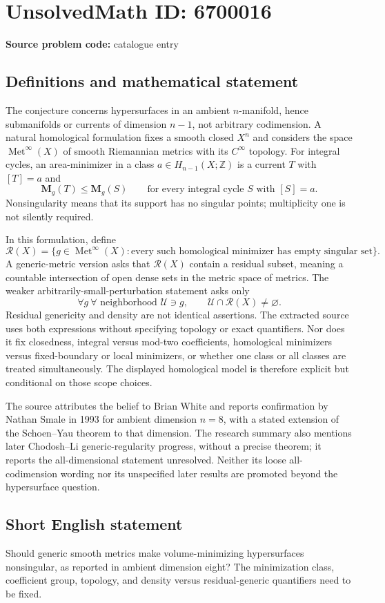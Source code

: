 \documentclass[11pt]{article}
\newcommand{\Z}{\mathbb{Z}}
\begin{document}
\section*{UnsolvedMath ID: 6700016}
\textbf{Source problem code:} catalogue entry
\subsection{Definitions and mathematical statement}
The conjecture concerns hypersurfaces in an ambient \(n\)-manifold, hence submanifolds or currents of dimension \(n-1\), not arbitrary codimension. A natural homological formulation fixes a smooth closed \(X^n\) and considers the space \(\operatorname{Met}^\infty(X)\) of smooth Riemannian metrics with its \(C^\infty\) topology. For integral cycles, an area-minimizer in a class \(a\in H_{n-1}(X;\Z)\) is a current \(T\) with \([T]=a\) and
\[
\mathbf M_g(T)\le\mathbf M_g(S)\qquad\text{for every integral cycle }S\text{ with }[S]=a.
\]
Nonsingularity means that its support has no singular points; multiplicity one is not silently required.

In this formulation, define
\[
\mathcal R(X)=\{g\in\operatorname{Met}^\infty(X):
 \text{every such homological minimizer has empty singular set}\}.
\]
A generic-metric version asks that \(\mathcal R(X)\) contain a residual subset, meaning a countable intersection of open dense sets in the metric space of metrics. The weaker arbitrarily-small-perturbation statement asks only
\[
\forall g\ \forall\text{ neighborhood }\mathcal U\ni g,
\qquad \mathcal U\cap\mathcal R(X)\ne\varnothing.
\]
Residual genericity and density are not identical assertions. The extracted source uses both expressions without specifying topology or exact quantifiers. Nor does it fix closedness, integral versus mod-two coefficients, homological minimizers versus fixed-boundary or local minimizers, or whether one class or all classes are treated simultaneously. The displayed homological model is therefore explicit but conditional on those scope choices.

The source attributes the belief to Brian White and reports confirmation by Nathan Smale in 1993 for ambient dimension \(n=8\), with a stated extension of the Schoen--Yau theorem to that dimension. The research summary also mentions later Chodosh--Li generic-regularity progress, without a precise theorem; it reports the all-dimensional statement unresolved. Neither its loose all-codimension wording nor its unspecified later results are promoted beyond the hypersurface question.
\subsection{Short English statement}
Should generic smooth metrics make volume-minimizing hypersurfaces nonsingular, as reported in ambient dimension eight? The minimization class, coefficient group, topology, and density versus residual-generic quantifiers need to be fixed.
\end{document}
